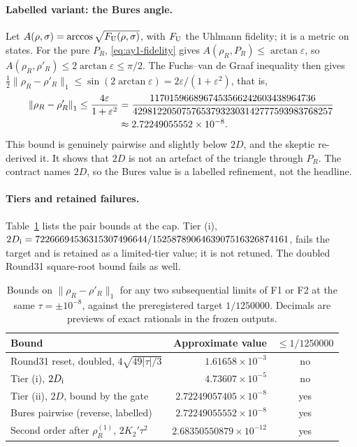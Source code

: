 \paragraph{Labelled variant: the Bures angle.}
Let $A(\rho,\sigma)=\arccos\sqrt{F_{\rm U}(\rho,\sigma)}$, with $F_{\rm U}$ the
Uhlmann fidelity; it is a metric on states. For the pure $P_R$,
\eqref{eq:ay1-fidelity} gives $A(\rho_R,P_R)\le\arctan\varepsilon$, so
$A(\rho_R,\rho'_R)\le2\arctan\varepsilon\le\pi/2$. The
Fuchs--van de Graaf inequality then gives
$\tfrac12\lVert \rho_R-\rho'_R\rVert_1\le\sin(2\arctan\varepsilon)=2\varepsilon/(1+\varepsilon^2)$,
that is,
\begin{equation}
 \begin{aligned}
 \left\lVert\rho_R-\rho'_R\right\rVert_1\le\frac{4\varepsilon}{1+\varepsilon^2}
 &=\frac{1170159668967453566242603438964736}{42981220507576537932303142777593983768257}\\
 &\approx2.72249055552\times10^{-8}.
 \end{aligned}
 \label{eq:ay1-bures}
\end{equation}
This bound is genuinely pairwise and slightly below $2D$, and the skeptic
re-derived it. It shows that $2D$ is not an artefact of the triangle through
$P_R$. The contract names $2D$, so the Bures value is a labelled refinement,
not the headline.

\paragraph{Tiers and retained failures.}
Table~\ref{tab:ay1-tiers} lists the pair bounds at the cap. Tier (i),
$2D_{\rm i}=72266694536315307496644/1525878906463907516326874161$, fails the
target and is retained as a limited-tier value; it is not retuned. The
doubled Round31 square-root bound fails as well.

\begin{table}[htbp]
\centering\small
\caption{Bounds on $\lVert \rho_R-\rho'_R\rVert_1$ for any two subsequential limits
of F1 or F2 at the same $\tau=\pm10^{-8}$, against the preregistered target
$1/1250000$. Decimals are previews of exact rationals in the frozen outputs.}
\label{tab:ay1-tiers}
\begin{tabular}{lrc}
\toprule
Bound & Approximate value & $\le1/1250000$\\
\midrule
Round31 reset, doubled, $4\sqrt{49|\tau|/3}$ & $1.61658\times10^{-3}$ & no\\
Tier (i), $2D_{\rm i}$ & $4.73607\times10^{-5}$ & no\\
Tier (ii), $2D$, bound by the gate & $2.72249057405\times10^{-8}$ & yes\\
Bures pairwise (reverse, labelled) & $2.72249055552\times10^{-8}$ & yes\\
Second order after $\rho^{(1)}_R$, $2K_2'\tau^2$ & $2.68350550879\times10^{-12}$ & yes\\
\bottomrule
\end{tabular}
\end{table}

